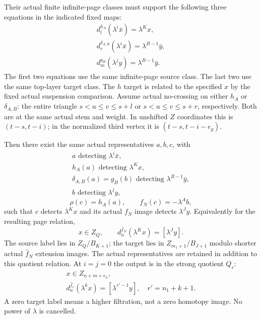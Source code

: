 \begin{theorem}
Their actual finite infinite-page classes must support the following three equations in the indicated fixed maps:
\[
\begin{gathered}
d_l^{h_A}(\lambda^i\bar x)=\lambda^Kx,\\
d_r^{\delta_{A,B}}(\lambda^i\bar x)=\lambda^{B-1}\bar y,\\
d_m^{g_B}(\lambda^jy)=\lambda^{B-1}\bar y.
\end{gathered}
\]
The first two equations use the same infinite-page source class. The last two use the same top-layer target class. The $h$ target is related to the specified $x$ by the fixed actual suspension comparison. Assume actual no-crossing on either $h_A$ or $\delta_{A,B}$: the entire triangle $s<u\leq v\leq s+l$ or $s<u\leq v\leq s+r$, respectively. Both are at the same actual stem and weight. In unshifted $Z$ coordinates this is $(t-s,t-i)$; in the normalized third vertex it is $(t-s,t-i-e_g)$.

Then there exist the same actual representatives $a,b,c$, with
\[
\begin{gathered}
a\text{ detecting }\lambda^i\bar x,\\
h_A(a)\text{ detecting }\lambda^Kx,\\
\delta_{A,B}(a)=g_B(b)\text{ detecting }\lambda^{B-1}\bar y,\\
b\text{ detecting }\lambda^jy,
\end{gathered}
\]
\[
\rho(c)=h_A(a),\qquad f_N(c)=-\lambda^Ab,
\]
such that $c$ detects $\lambda^Kx$ and its actual $f_N$ image detects $\lambda^Jy$. Equivalently for the resulting page relation,
\[
x\in Z_Q,\qquad d_n^{\hat f_N}(\lambda^Kx)=[\lambda^Jy].
\]
The source label lies in $Z_Q/B_{K+1}$; the target lies in $Z_{m_1+1}/B_{J+1}$ modulo shorter actual $\hat f_N$ extension images. The actual representatives are retained in addition to this quotient relation. At $i=j=0$ the output is in the strong quotient $Q_r$:
\[
\begin{gathered}
x\in Z_{n+m+e_h},\\
d_n^{\hat f_r}(\lambda^kx)=[\lambda^{r'-1}y],\quad r'=n_1+k+1.
\end{gathered}
\]
A zero target label means a higher filtration, not a zero homotopy image. No power of $\lambda$ is cancelled.


\end{theorem}
